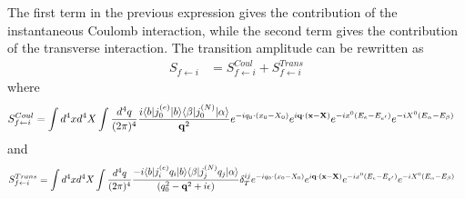 The first term in the previous expression gives the contribution of the instantaneous Coulomb interaction, while the second term gives the contribution of the transverse interaction. The transition amplitude can be rewritten as
\begin{align}
    S_{f\leftarrow i} & = S_{f\leftarrow i}^{Coul} + S_{f\leftarrow i}^{Trans}
\end{align}
where
\begin{align}
    S_{f\leftarrow i}^{Coul} & = \int d^4x d^4 X \int \frac{d^4 q}{(2\pi)^4} \frac{i\langle b| j^{(e)}_{0} |b\rangle  \langle \beta| j^{(N)}_{0}  |\alpha\rangle}{{\bf q}^2} e^{-i q_0 \cdot (x_0 - X_0)} e^{i{\bf q}\cdot({\bf x} - {\bf X})} e^{-ix^0(E_e-E_{e'})}e^{-iX^0(E_\alpha-E_{\beta})}
\end{align}
and
\begin{align}
    S_{f\leftarrow i}^{Trans} & = \int d^4x d^4 X \int \frac{d^4 q}{(2\pi)^4} \frac{-i\langle b| j^{(e)}_{i}  q_i|b\rangle  \langle \beta| j^{(N)}_{j} q_j |\alpha\rangle}{(q_0^2 -{\bf q}^2+ i\epsilon)}\delta^{ij}_T e^{-i q_0 \cdot (x_0 - X_0)} e^{i{\bf q}\cdot({\bf x} - {\bf X})} e^{-ix^0(E_e-E_{e'})}e^{-iX^0(E_\alpha-E_{\beta})}
\end{align}

